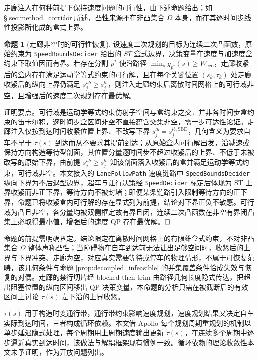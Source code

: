 \documentclass[a4paper,zihao=5]{ctexart}
\theoremstyle{definition}
\newtheorem{proposition}{命题}[section]
\begin{document}
走廊注入在何种前提下保持速度问题的可行性，由下述命题给出；如§\ref{sec:method_corridor}所述，凸性来源不在非凸集合 $\Omega$ 本身，而在其逐时间步线性投影所化成的盒式上界。

\begin{proposition}[走廊非空时的可行性恢复]
\label{prop:feasibility_recovery}
设速度二次规划的目标为连续二次凸函数，原始约束为 \texttt{SpeedBoundsDecider} 给出的 $ST$ 盒式边界，决策变量在速度与加速度盒约束下取值因而有界。若存在分割 $p^{*}$ 使沿路径 $\min_s g_{p^{*}}(s) \geq W_{\text{ego}}$，走廊收紧后的盒内存在满足运动学等式约束的可行解，且在每个关键位置 $(s_k, \tau_k)$ 处走廊收紧后的纵向上界仍满足 $s_j^{ub} \geq s_j^{lb}$，则注入走廊约束后离散时间网格上的可行域非空，且增强后的速度二次规划存在最优解。
\end{proposition}

证明要点。可行域是运动学等式约束仿射子空间与盒约束之交，并非各时间步盒约束的笛卡尔积，逐时间步盒区间非空不直接蕴含交集非空，需一步可达性论证。走廊注入仅按到达时间收紧位置上界、不改写下界 $s_j^{lb}=s_j^{lb,\mathrm{SBD}}$，几何含义为要求自车不早于 $\tau(s)$ 到达而从不要求其提前到达；从原始盒内可行解出发，沿减速或保持方向构造等待型剖面，其位置分量逐时间步不超过收紧后的上界、不低于未被改写的原始下界，由前提 $s_j^{ub} \geq s_j^{lb}$ 知该剖面落入收紧后的盒并满足运动学等式约束，可行域非空。本文接入的 \texttt{LaneFollowPath} 速度链路中 \texttt{SpeedBoundsDecider} 纵向下界为不后退型边界，超车与让行决策经 \texttt{SpeedDecider} 标定后体现为 ST 上界收紧而非正下界，等待方向不被封堵；即便某条链路引入限制等待方向的正下界，命题已将收紧盒内可行解的存在显式列为前提，结论对下界正负不敏感。可行域为凸且非空，各分量均被双侧框定故有界且闭，连续二次凸函数在非空有界闭凸集上必取得最小值，增强后的速度 QP 存在最优解。$\hfill\Box$

命题的前提需明确界定。结论限定在离散时间网格上的有限维盒式约束，不对非凸集合 $\Omega$ 整体声称凸性；当障碍物在自车到达前无法让出足够空间时，收紧后的上界与下界冲突、走廊为空，对应真实需要等待或停车的物理情形，不属于可恢复范畴，该几何条件与命题 \ref{prop:decoupled_infeasible} 的并集覆盖条件恰成失效与恢复的对偶。走廊的禁行切片经 blocked-then-trim 由路径几何长度隐式传达，把超出阻塞位置的纵向区间移出 QP 决策变量，本命题的分析只需在被截断后的有效区间上讨论 $\tau(s)$ 左下沿的上界收紧。

$\tau(s)$ 用于构造时变通行带，通行带约束影响速度规划，速度规划结果又决定自车实际到达时间，三者构成循环依赖。本文借 Apollo 每个规划周期重规划的机制以单步延迟隐式处理，每个周期用上周期速度输出更新 $\tau(s)$，在连续多个周期中逐步逼近真实到达时间，该做法与解耦框架现有惯例一致。循环依赖的理论收敛性本文未予证明，作为开放问题列出。
\end{document}
